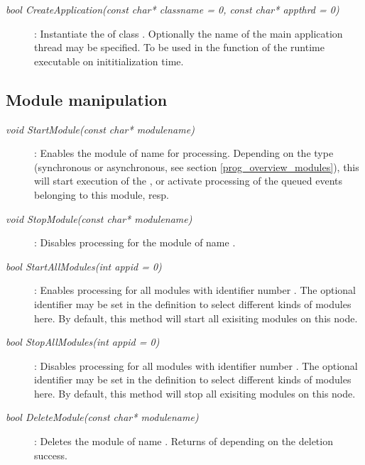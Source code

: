 \begin{description}
  
\item[\em bool CreateApplication\small (const char* classname = 0, const char* appthrd = 0)] :
Instantiate the  of class . Optionally
the name  of the main application thread may be specified.
To be used in the  function of the runtime executable on
inititialization time.

\end{description}	 


\subsection{Module manipulation}	

\begin{description}

\item[\em void StartModule\small (const char* modulename)] :
Enables the module of name  for processing.
Depending on the  type (synchronous or asynchronous,
see section \ref{prog_overview_modules}), this will start
execution of the , or activate processing of the
queued events belonging to this module, resp.

\item[\em void StopModule\small (const char* modulename)] :
Disables processing for the module of name .


\item[\em bool StartAllModules\small (int appid = 0)] :
Enables processing for all modules with identifier number .
The optional identifier  may be set in the  definition
to select different kinds of modules here. By default, this method will
start all exisiting modules on this node.

\item[\em bool StopAllModules\small (int appid = 0)] :
Disables processing for all modules with identifier number .
The optional identifier  may be set in the  definition
to select different kinds of modules here. By default, this method will
stop all exisiting modules on this node.

\item[\em bool DeleteModule\small (const char* modulename)] :
Deletes the module of name . Returns  of  
 depending on the deletion success.


\end{description}
